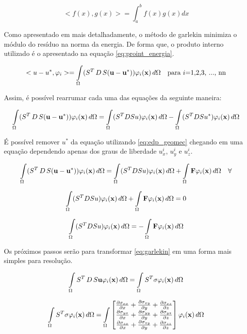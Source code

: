 \begin{equation}
    <f(x), g(x)> = \int^b_af(x)g(x) dx
\end{equation}

Como apresentado em \cite{CompGeomec} mais detalhadamente, o método de garlekin minimiza o módulo do resíduo na norma da energia. De forma que, o produto interno utilizado é o apresentado na equação \ref{eq:proint_energia}.


\begin{equation}
\label{eq:proint_energia}
<u-u^*, \varphi_i> = \omeint{(S^T\,D\,S(\mathbf{u - u^*})) \phiix} \quad \text{para $i$=1,2,3, ..., nn}
\end{equation}

Assim, é possível rearrumar cada uma das equações da seguinte maneira:


\begin{equation}
\omeint{(S^T\,D\,S(\mathbf{u - u^*})) \phiix}  =  \omeint{(S^TDSu)\phiix} - \omeint{(S^TDSu^*)\phiix}
\end{equation}

É possível remover $u^*$ da equação utilizando \ref{eq:edp_geomec} chegando em uma equação dependendo apenas dos graus de liberdade $u^i_x$, $u^i_y$ e $u^i_z$.

\begin{equation}
\omeint{(S^T\,D\,S(\mathbf{u - u^*})) \phiix}  =  \omeint{(S^TDSu)\phiix} + \omeint{\mathbf{F}\phiix} \quad \forall
\end{equation}

\begin{equation}
\omeint{(S^TDSu)\phiix} + \omeint{\mathbf{F}\phiix} = 0
\end{equation}

\begin{equation} \label{eq:garlekin}
\omeint{(S^TDSu)\phiix} = - \omeint{\mathbf{F}\phiix}
\end{equation}



Os próximos passos serão para transformar \ref{eq:garlekin} em uma forma mais simples para resolução.

\begin{equation}
\omeint{S^T\,D\,S\mathbf{u} \phiix} = \omeint{S^T\sigma \phiix}
\end{equation}

\begin{equation}
\omeint{S^T\sigma \phiix} = \omeint{\sstensor \phiix}
\end{equation}

